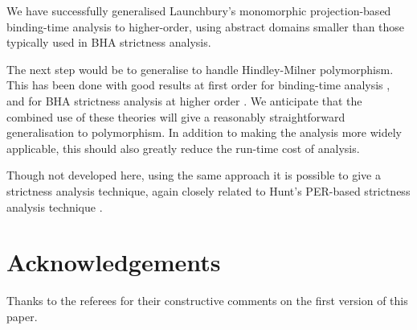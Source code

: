 We have successfully generalised Launchbury's monomorphic
projection-based binding-time analysis to higher-order, using
abstract domains smaller than those typically used in BHA
strictness analysis.

The next step would be to generalise to handle Hindley-Milner
polymorphism.  This has been done with good results at first order for
binding-time analysis \cite{Lau91a}, and for BHA strictness analysis
at higher order \cite{Bar91,Bar93}.  We anticipate that the combined
use of these theories will give a reasonably straightforward generalisation
to polymorphism.  In addition to making the analysis more widely applicable,
this should also greatly reduce the run-time cost of analysis.

Though not developed here, using the same approach it is
possible to give a strictness analysis technique, again closely related to
Hunt's PER-based strictness analysis technique \cite{Hun91}.

\section{Acknowledgements}

Thanks to the referees for their constructive comments on the first
version of this paper.



